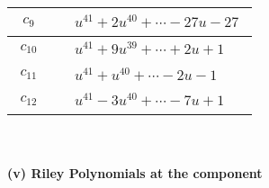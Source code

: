 \documentclass[1p]{elsarticle_modified}
\theoremstyle{definition}
\begin{document}
\begin{tabular}{m{50pt}|m{274pt}}
\hline $$\begin{aligned}c_{9}\end{aligned}$$&$\begin{aligned}
&u^{41}+2 u^{40}+\cdots-27 u-27
\end{aligned}$\\
\hline $$\begin{aligned}c_{10}\end{aligned}$$&$\begin{aligned}
&u^{41}+9 u^{39}+\cdots+2 u+1
\end{aligned}$\\
\hline $$\begin{aligned}c_{11}\end{aligned}$$&$\begin{aligned}
&u^{41}+u^{40}+\cdots-2 u-1
\end{aligned}$\\
\hline $$\begin{aligned}c_{12}\end{aligned}$$&$\begin{aligned}
&u^{41}-3 u^{40}+\cdots-7 u+1
\end{aligned}$\\
\hline
\end{tabular}\\~\\
\newpage\renewcommand{\arraystretch}{1}
\flushleft \textbf{(v) Riley Polynomials at the component}\newline \\
\end{document}
